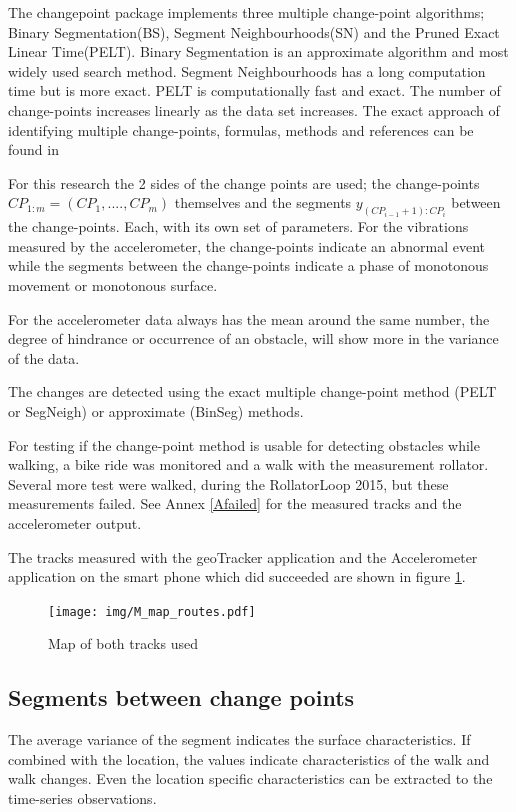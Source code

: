 


The changepoint package implements three multiple change-point algorithms; Binary Segmentation(BS), Segment Neighbourhoods(SN) and the Pruned Exact Linear Time(PELT). Binary Segmentation is an approximate algorithm and most widely used search method. Segment Neighbourhoods has a long computation time but is more exact. PELT is computationally fast and exact. The number of change-points increases linearly as the data set increases. The exact approach of identifying multiple change-points, formulas, methods and references can be found in~\cite{killick2014}

	
For this research the 2 sides of the change points are used; the change-points $CP_{1:m} = (CP_{1}, .... , CP_{m})$ themselves and the segments $y_{(CP_{i−1} +1):CP_{i}}$ between the change-points. Each, with its own set of parameters. For the vibrations measured by the accelerometer, the change-points indicate an abnormal event while the segments between the change-points indicate a phase of monotonous movement or monotonous surface. 


For the accelerometer data always has the mean around the same number, the degree of hindrance or occurrence of an obstacle, will show more in the variance of the data. 


The changes are detected using the exact multiple change-point method (PELT or SegNeigh) or approximate (BinSeg) methods. ~\cite{changepoint2015}\newline

For testing if the change-point method is usable for detecting obstacles while walking, a bike ride was monitored and a walk with the measurement rollator. 
Several more test were walked, during the RollatorLoop 2015, but these measurements failed. See Annex \ref{Afailed} for the measured tracks and the accelerometer output. 

The tracks measured with the geoTracker application and the Accelerometer application on the smart phone which did succeeded are shown in figure \ref{tracks}. 

\begin{figure}[h]
\texttt{[image: img/M\_map\_routes.pdf]}
\centering
\caption{ Map of both tracks used \label{tracks}}
\end{figure}

\subsection{Segments between change points}
The average variance of the segment indicates the surface characteristics. If combined with the location, the values indicate characteristics of the walk and walk changes. Even the location specific characteristics can be extracted to the time-series observations.

